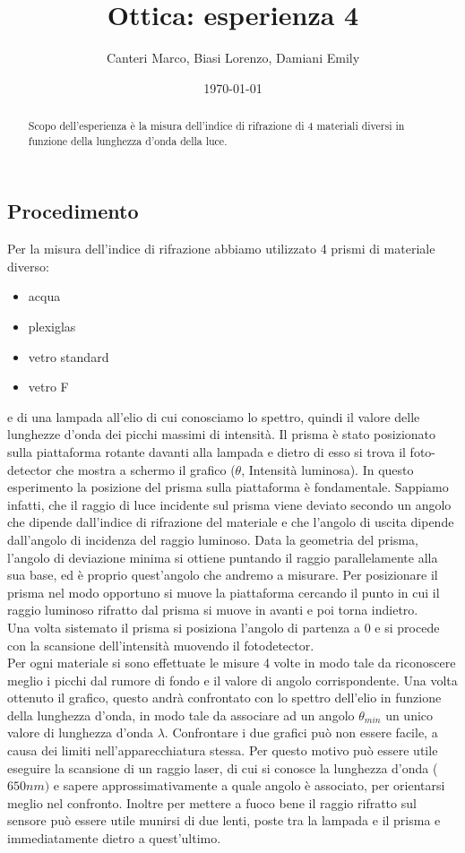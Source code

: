 \documentclass[letterpaper,11pt]{article}
\title{\textbf{Ottica:} esperienza 4}
\author{Canteri Marco, Biasi Lorenzo, Damiani Emily}
\date{\today}
\begin{document}
\maketitle

\begin{abstract}
\hspace{-1.9em}
Scopo dell'esperienza è la misura dell'indice di rifrazione di 4 materiali diversi in funzione della lunghezza d'onda della luce. 
\end{abstract}

\begin{body}
\section{Procedimento}
Per la misura dell'indice di rifrazione abbiamo utilizzato 4 prismi di materiale diverso: 
\begin{itemize}
\item acqua 
\item plexiglas
\item vetro standard
\item vetro F 
\end{itemize}
e di una lampada all'elio di cui conosciamo lo spettro, quindi il valore delle lunghezze d'onda dei picchi massimi di intensità. Il prisma è stato posizionato sulla piattaforma rotante davanti alla lampada e dietro di esso si trova il foto-detector che mostra a schermo il grafico ($\theta$, Intensità luminosa). In questo esperimento la posizione del prisma sulla piattaforma è fondamentale. Sappiamo infatti, che il raggio di luce incidente sul prisma viene deviato secondo un angolo che dipende dall'indice di rifrazione del materiale e che l'angolo di uscita dipende dall'angolo di incidenza del raggio luminoso. Data la geometria del prisma, l'angolo di deviazione minima si ottiene puntando il raggio parallelamente alla sua base, ed è proprio quest'angolo che andremo a misurare. Per posizionare il prisma nel modo opportuno si  muove la piattaforma cercando il punto in cui il raggio luminoso rifratto dal prisma si muove in avanti e poi torna indietro. \\
Una volta sistemato il prisma si posiziona l'angolo di partenza a $0$ e si procede con la scansione dell'intensità muovendo il fotodetector. \\
Per ogni materiale si sono effettuate le misure 4 volte in modo tale da riconoscere meglio i picchi dal rumore di fondo e il valore di angolo corrispondente. Una volta ottenuto il grafico, questo andrà confrontato con lo spettro dell'elio in funzione della lunghezza d'onda, in modo tale da associare ad un angolo $\theta_{min}$ un unico valore di lunghezza d'onda $\lambda$. Confrontare i due grafici può non essere facile, a causa dei limiti nell'apparecchiatura stessa. Per questo motivo può essere utile eseguire la scansione di un raggio laser, di cui si conosce la lunghezza d'onda ($650 nm)$ e sapere approssimativamente a quale angolo è associato, per orientarsi meglio nel confronto. Inoltre per mettere a fuoco bene il raggio rifratto sul sensore può essere utile munirsi di due lenti, poste tra la lampada e il prisma e immediatamente dietro a quest'ultimo.\\

\end{body}
\end{document}
